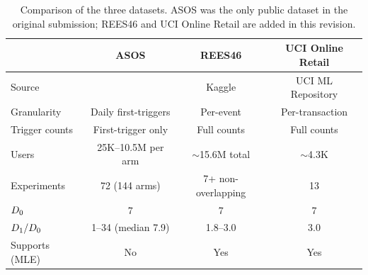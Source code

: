 \begin{table}[H]
\centering
\caption{Comparison of the three datasets.
ASOS was the only public dataset in the original submission;
REES46 and UCI Online Retail are added in this revision.}
\label{tab:data_comparison}
\small
\begin{tabular}{@{}lccc@{}}
\toprule
& \textbf{ASOS} & \textbf{REES46} & \textbf{UCI Online Retail} \\
\midrule
Source & \citet{liu2021datasets} & Kaggle & UCI ML Repository \\
Granularity & Daily first-triggers & Per-event & Per-transaction \\
Trigger counts & First-trigger only & Full counts & Full counts \\
Users & 25K--10.5M per arm & $\sim$15.6M total & $\sim$4.3K \\
Experiments & 72 (144 arms) & 7+ non-overlapping & 13 \\
$D_0$ & 7 & 7 & 7 \\
$D_1 / D_0$ & 1--34 (median 7.9) & 1.8--3.0 & 3.0 \\
Supports \nbmodel{} (MLE) & No & Yes & Yes \\
\bottomrule
\end{tabular}
\end{table}
